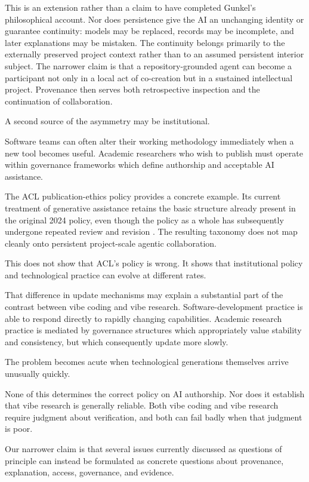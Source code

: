 \documentclass[12pt]{article}
\begin{document}
This is an extension rather than a claim to have completed Gunkel's philosophical account. Nor does persistence give the AI an unchanging identity or guarantee continuity: models may be replaced, records may be incomplete, and later explanations may be mistaken. The continuity belongs primarily to the externally preserved project context rather than to an assumed persistent interior subject. The narrower claim is that a repository-grounded agent can become a participant not only in a local act of co-creation but in a sustained intellectual project. Provenance then serves both retrospective inspection and the continuation of collaboration.

A second source of the asymmetry may be institutional.

Software teams can often alter their working methodology immediately when a new tool becomes useful. Academic researchers who wish to publish must operate within governance frameworks which define authorship and acceptable AI assistance.

The ACL publication-ethics policy provides a concrete example. Its current treatment of generative assistance retains the basic structure already present in the original 2024 policy, even though the policy as a whole has subsequently undergone repeated review and revision \citep{acl2024policy,acl2026policy,aclresolutions2025}. The resulting taxonomy does not map cleanly onto persistent project-scale agentic collaboration.

This does not show that ACL's policy is wrong. It shows that institutional policy and technological practice can evolve at different rates.

That difference in update mechanisms may explain a substantial part of the contrast between vibe coding and vibe research. Software-development practice is able to respond directly to rapidly changing capabilities. Academic research practice is mediated by governance structures which appropriately value stability and consistency, but which consequently update more slowly.

The problem becomes acute when technological generations themselves arrive unusually quickly.

None of this determines the correct policy on AI authorship. Nor does it establish that vibe research is generally reliable. Both vibe coding and vibe research require judgment about verification, and both can fail badly when that judgment is poor.

Our narrower claim is that several issues currently discussed as questions of principle can instead be formulated as concrete questions about provenance, explanation, access, governance, and evidence.
\end{document}

